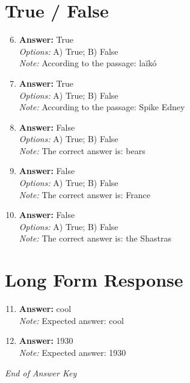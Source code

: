 \documentclass[12pt]{article}
\begin{document}
\section*{True / False}
\begin{enumerate}[label=\arabic*.]
\setcounter{enumi}{5}
\item \textbf{Answer:} True
\\ \textit{Options:} A) True; B) False
\\ \textit{Note:} According to the passage: laïkó
\item \textbf{Answer:} True
\\ \textit{Options:} A) True; B) False
\\ \textit{Note:} According to the passage: Spike Edney
\item \textbf{Answer:} False
\\ \textit{Options:} A) True; B) False
\\ \textit{Note:} The correct answer is: bears
\item \textbf{Answer:} False
\\ \textit{Options:} A) True; B) False
\\ \textit{Note:} The correct answer is: France
\item \textbf{Answer:} False
\\ \textit{Options:} A) True; B) False
\\ \textit{Note:} The correct answer is: the Shastras
\end{enumerate}

\section*{Long Form Response}
\begin{enumerate}[label=\arabic*.]
\setcounter{enumi}{10}
\item \textbf{Answer:} cool
\\ \textit{Note:} Expected answer: cool
\item \textbf{Answer:} 1930
\\ \textit{Note:} Expected answer: 1930
\end{enumerate}

\vfill
\noindent\textit{End of Answer Key}
\end{document}
